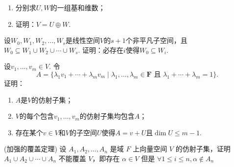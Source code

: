 \begin{exercise}
\begin{exgroup}
\begin{enumerate}
            \item 分别求$U,W$的一组基和维数；

            \item 证明：$V=U\oplus W$.
        \end{enumerate}

        \item 设$W_0,W_1,W_2,\ldots,W_s$是线性空间$V$的$s+1$个非平凡子空间，且$W_0 \subseteq W_1 \cup W_2 \cup \cdots \cup W_s$. 证明：必存在$i$使得$W_0\subseteq W_i$.

        \item 设$v_1,\ldots,v_m\in V$. 令
        \[A=\{\lambda_1v_1+\cdots+\lambda_mv_m \mid \lambda_1,\ldots,\lambda_m\in\mathbf{F}\text{~且~}\lambda_1+\cdots+\lambda_m=1\}.\]
        证明：
        \begin{enumerate}
            \item $A$是$V$的仿射子集；

            \item $V$的每个包含$v_1,\ldots,v_m$的仿射子集均包含$A$；

            \item 存在某个$v\in V$和$V$的子空间$U$使得$A=v+U$且$\dim U\leqslant m-1$.
        \end{enumerate}

        \item (加强的覆盖定理) 设 $A_1, A_2, \ldots, A_n$ 是域 $F$ 上向量空间 $V$ 的仿射子集，证明 $A_1\cup A_2\cup \cdots \cup A_n$ 不能覆盖 $V$，即存在 $\alpha \in V$ 但是 $\forall 1\leqslant i\leqslant n, \alpha \notin A_n$
    \end{exgroup}
\end{exercise}
